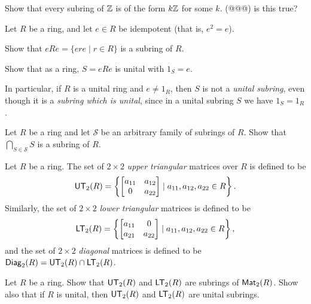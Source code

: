 \begin{exercise}
Show that every subring of \(\mathbb{Z}\) is of the form \(k\mathbb{Z}\) for some \(k\). (@@@) is this true?
\end{exercise}

\begin{exercise}
Let \(R\) be a ring, and let \(e \in R\) be idempotent (that is, \(e^2 = e\)).
\begin{proplist*}
\item Show that \(eRe = \{ ere \mid r \in R \}\) is a subring of \(R\).
\item Show that as a ring, \(S = eRe\) is unital with \(1_S = e\).
\end{proplist*}
In particular, if \(R\) is a unital ring and \(e \neq 1_R\), then \(S\) is not a \emph{unital subring}, even though it is a \emph{subring which is unital}, since in a unital subring \(S\) we have \(1_S = 1_R\).
\end{exercise}

\begin{exercise}
Let \(R\) be a ring and let \(\mathcal{S}\) be an arbitrary family of subrings of \(R\).
Show that \(\bigcap_{S \in \mathcal{S}} S\) is a subring of \(R\).
\end{exercise}

\begin{dfn} \label{dfn:triangular-diagonal-matrix}
Let \(R\) be a ring. The set of \(2 \times 2\) \emph{upper triangular} matrices over \(R\) is defined to be \[ \mathsf{UT}_{2}(R) = \left\{ \begin{bmatrix} a_{11} & a_{12} \\ 0 & a_{22} \end{bmatrix} \mid a_{11}, a_{12}, a_{22} \in R \right\}. \] Similarly, the set of \(2 \times 2\) \emph{lower triangular} matrices is defined to be \[ \mathsf{LT}_{2}(R) = \left\{ \begin{bmatrix} a_{11} & 0 \\ a_{21} & a_{22} \end{bmatrix} \mid a_{11}, a_{12}, a_{22} \in R \right\}, \] and the set of \(2 \times 2\) \emph{diagonal} matrices is defined to be \(\mathsf{Diag}_{2}(R) = \mathsf{UT}_{2}(R) \cap \mathsf{LT}_{2}(R)\).
\end{dfn}

\begin{exercise}
Let \(R\) be a ring. Show that \(\mathsf{UT}_{2}(R)\) and \(\mathsf{LT}_{2}(R)\) are subrings of \(\mathsf{Mat}_{2}(R)\). Show also that if \(R\) is unital, then \(\mathsf{UT}_{2}(R)\) and \(\mathsf{LT}_{2}(R)\) are unital subrings.
\end{exercise}

